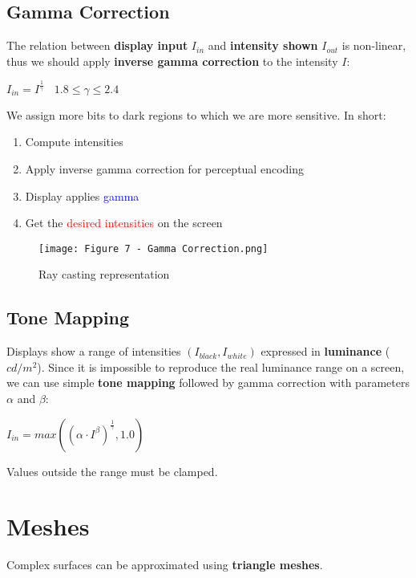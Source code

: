 \documentclass{article}
\begin{document}
\subsection{Gamma Correction}
The relation between \textbf{display input} $I_{in}$ and \textbf{intensity shown} $I_{out}$ is non-linear, thus we should apply \textbf{inverse gamma correction} to the intensity $I$:
\begin{center}
    $I_{in} = I^{\frac{1}{\gamma}} \ \ \ \ 1.8 \leq \gamma \leq 2.4$
\end{center}
We assign more bits to dark regions to which we are more sensitive. In short:
\begin{enumerate}
    \item Compute intensities
    \item Apply \textcolor{OliveGreen}{inverse gamma correction} for perceptual encoding
    \item Display applies \textcolor{blue}{gamma}
    \item Get the \textcolor{red}{desired intensities} on the screen
\end{enumerate}
\begin{figure}[H]
    \centering
    \texttt{[image: Figure 7 - Gamma Correction.png]}
    \caption{Ray casting representation}
\end{figure}
\subsection{Tone Mapping}
Displays show a range of intensities $ (I_{black}, I_{white}) $ expressed in \textbf{luminance} ($cd/m^2$). Since it is impossible to reproduce the real luminance range on a screen, we can use simple \textbf{tone mapping} followed by gamma correction with parameters $\alpha$ and $\beta$:
\begin{center}
    $I_{in} = max((\alpha \cdot I^\beta)^{\frac{1}{\gamma}}, 1.0)$ 
\end{center}
Values outside the range must be clamped.

\newpage

\section{Meshes}
Complex surfaces can be approximated using \textbf{triangle meshes}.
\end{document}
